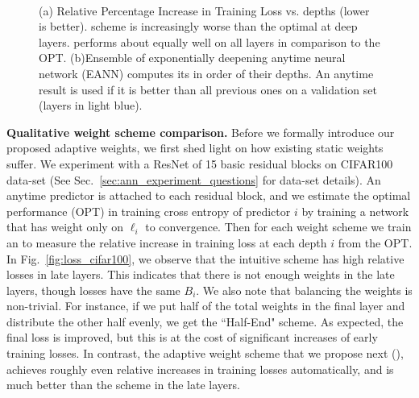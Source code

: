 \begin{figure}
    \centering
    ~
    \caption{(a) Relative Percentage Increase in Training Loss vs. depths (lower is better). \const scheme is increasingly worse than the optimal at deep layers. \adaloss performs about equally well on all layers in comparison to the OPT.
    (b)Ensemble of exponentially deepening anytime neural network (EANN) computes its \anns in order of their depths. An anytime result is used if it is better than all previous ones on a validation set (layers in light blue). }
    
\end{figure}

    


\textbf{Qualitative weight scheme comparison.} Before we formally introduce our proposed adaptive weights, we first shed light on how existing static weights suffer. We experiment with a ResNet of 15 basic residual blocks on CIFAR100~\cite{cifar} data-set (See Sec.~\ref{sec:ann_experiment_questions} for data-set details). An anytime predictor is attached to each residual block, and we estimate the optimal performance (OPT) in training cross entropy of predictor $i$ by training a network that has weight only on $\ell_i$ to convergence. Then for each weight scheme we train an \ann to measure the relative increase in training loss at each depth $i$ from the OPT. In Fig.~\ref{fig:loss_cifar100}, we observe that the intuitive \const scheme has high relative losses in late layers. This indicates that there is not enough weights in the late layers, though losses have the same $B_i$.  We also note that balancing the weights is non-trivial. For instance, if we put half of the total weights in the final layer and distribute the other half evenly, we get the ``Half-End" scheme. As expected, the final loss is improved, but this is at the cost of significant increases of early training losses. In contrast, the adaptive weight scheme that we propose next (\adaloss), achieves roughly even relative increases in training losses automatically, and is much better than the \const scheme in the late layers.


